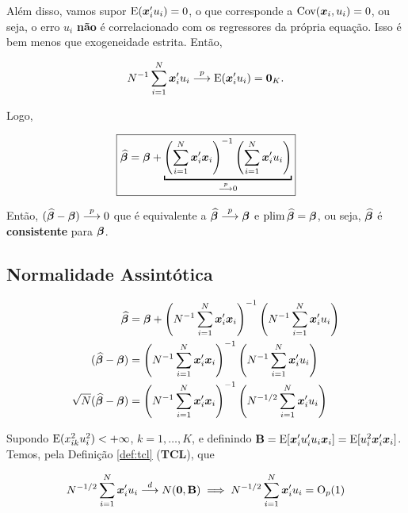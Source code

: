 \documentclass[11pt, oneside, a4paper, article]{article}
\numberwithin{equation}{section}
\begin{document}
Além disso, vamos supor $\text{E}(\boldsymbol{x}_{i}' u_{i}) = 0$, o que corresponde a $\text{Cov}(\boldsymbol{x}_{i}, u_{i}) = 0$, ou seja, o erro $u_{i}$ \textbf{não} é correlacionado com os regressores da própria equação.
Isso é bem menos que exogeneidade estrita.
Então, 

\vspace{-1 em}
\begin{align*}
	N^{-1} \sum_{i=1}^{N} \boldsymbol{x}_{i}' u_{i}  \overset{p}{\longrightarrow}  \text{E}(\boldsymbol{x}_{i}' u_{i}) = \boldsymbol{0}_{K}.
\end{align*}

Logo,

\vspace{-1 em}
\begin{align*}
	\boxed{
\betahatbold = 
\betavec +
\underbracket[1pt]{
\left( \sum_{i=1}^{N} \xvec_{i}' \xvec_{i} \right)^{-1}
\left( \sum_{i=1}^{N} \xvec_{i}' u_{i} \right)}_{\arrowp 0}
}
\end{align*}

Então, 
$(\widehat{\boldsymbol{\beta}} - \boldsymbol{\beta})  \overset{p}{\longrightarrow}  0$ 
que é equivalente a 
$\widehat{\boldsymbol{\beta}}  \overset{p}{\longrightarrow}  \boldsymbol{\beta}$ e 
$\text{plim} \,\widehat{\boldsymbol{\beta}} = \boldsymbol{\beta}$,
ou seja, $\widehat{\boldsymbol{\beta}}$ é \textbf{consistente} para $\boldsymbol{\beta}$.

\subsection{Normalidade Assintótica} %

\vspace{-2 em}
\begin{align*}
\widehat{\boldsymbol{\beta}} 
&= 
\boldsymbol{\beta} +
\left( N^{-1} \sum_{i=1}^{N} \boldsymbol{x}_{i}' \boldsymbol{x}_{i} \right)^{-1}
\left( N^{-1} \sum_{i=1}^{N} \boldsymbol{x}_{i}' u_{i} \right)
\\
(\widehat{\boldsymbol{\beta}} - \boldsymbol{\beta})
&=
\left( N^{-1} \sum_{i=1}^{N} \boldsymbol{x}_{i}' \boldsymbol{x}_{i} \right)^{-1}
\left( N^{-1} \sum_{i=1}^{N} \boldsymbol{x}_{i}' u_{i} \right)
\\
\sqrt{N} (\widehat{\boldsymbol{\beta}} - \boldsymbol{\beta}) &=
\left( N^{-1} \sum_{i=1}^{N} \boldsymbol{x}_{i}' \boldsymbol{x}_{i} \right)^{-1}
\left( N^{-1/2} \sum_{i=1}^{N} \boldsymbol{x}_{i}' u_{i} \right)
\end{align*}

\noindent
Supondo
$\text{E}( x_{ik}^{2} u_{i}^{2} ) < + \infty$,
$k=1, \dots, K$, e definindo
$\mathbf{B} = \text{E}[\boldsymbol{x}_{i}' u_{i}' u_{i} \boldsymbol{x}_{i}] = \text{E}[ u_{i}^2 \boldsymbol{x}_{i}' \boldsymbol{x}_{i} ]$.
Temos, pela Definição \ref{def:tcl} (\textbf{TCL}), que

\vspace{-1 em}
\begin{align} \label{eq:limxu}
N^{-1/2} \sum_{i=1}^{N} \boldsymbol{x}_{i}' u_{i}  \overset{d}{\longrightarrow}  N(\boldsymbol{0}, \mathbf{B})
\implies
N^{-1/2} \sum_{i=1}^{N} \boldsymbol{x}_{i}' u_{i} = \text{O}_{p}(1)
\end{align}
\end{document}
